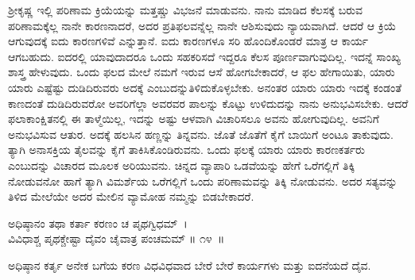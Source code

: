 ಶ‍್ರೀಕೃಷ್ಣ ಇಲ್ಲಿ ಪರಿಣಾಮ ಕ್ರಿಯೆಯನ್ನು ಮತ್ತಷ್ಚು ವಿಭಜನೆ ಮಾಡುವನು. ನಾನು ಮಾಡಿದ ಕೆಲಸಕ್ಕೆ ಬರುವ ಪರಿಣಾಮಕ್ಕೆಲ್ಲ ನಾನೇ ಕಾರಣನಾದರೆ, ಅದರ ಪ್ರತಿಫಲವನ್ನೆಲ್ಲ ನಾನೇ ಆಶಿಸುವುದು ನ್ಯಾಯವಾಗಿದೆ. ಆದರೆ ಆ ಕ್ರಿಯೆ ಆಗುವುದಕ್ಕೆ ಐದು ಕಾರಣಗಳಿವೆ ಎನ್ನುತ್ತಾನೆ. ಐದು ಕಾರಣಗಳೂ ಸರಿ ಹೊಂದಿಕೊಂಡರೆ ಮಾತ್ರ ಆ ಕಾರ್ಯ ಆಗಬಹುದು. ಐದರಲ್ಲಿ ಯಾವು\-ದಾದರೂ ಒಂದು ಸಹಕರಿಸದೆ ಇದ್ದರೂ ಕೆಲಸ ಪೂರ್ಣವಾಗುವುದಿಲ್ಲ. ಇದನ್ನೆ ಸಾಂಖ್ಯ ಶಾಸ್ತ್ರ ಹೇಳುವುದು. ಒಂದು ಫಲದ ಮೇಲೆ ನಮಗೆ ಇರುವ ಆಸೆ ಹೋಗಬೇಕಾದರೆ, ಆ ಫಲ ಹೇಗಾಯಿತು, ಯಾರು ಯಾರು ಎಷ್ಟೆಷ್ಟು ದುಡಿದಿರುವರು ಅದಕ್ಕೆ ಎಂಬುದನ್ನು\break ತಿಳಿದುಕೊಳ್ಳಬೇಕು. ಅನಂತರ ಯಾರು ಯಾರು ಇದಕ್ಕೆ ಕಂಡಂತೆ ಕಾಣದಂತೆ ದುಡಿದಿರುವರೋ ಅವರಿಗೆಲ್ಲಾ ಅವರವರ ಪಾಲನ್ನು ಕೊಟ್ಟು ಉಳಿದುದನ್ನು ನಾನು ಅನುಭವಿಸಬೇಕು. ಆದರೆ ಫಲಾಕಾಂಕ್ಷಿತನಲ್ಲಿ ಈ ತಾಳ್ಮೆಯಿಲ್ಲ, ಇದನ್ನು ಅಷ್ಟು ಆಳವಾಗಿ ವಿಚಾರಿಸಲೂ ಅವನು ಹೋಗುವುದಿಲ್ಲ. ಅವನಿಗೆ ಅನುಭವಿಸುವ ಆತುರ. ಅದಕ್ಕೆ ಹಲಸಿನ ಹಣ್ಣನ್ನು ತಿನ್ನವನು. ಜೊತೆ ಜೊತೆಗೆ ಕೈಗೆ ಬಾಯಿಗೆ ಅಂಟೂ ತಾಕುವುದು. ತ್ಯಾಗಿ ಅನಾಸಕ್ತಿಯ ತೈಲವನ್ನು ಕೈಗೆ ತಾಕಿಸಿಕೊಂಡಿರುವನು. ಒಂದು ಫಲಕ್ಕೆ ಯಾರು ಯಾರು ಕಾರಣಕರ್ತರು ಎಂಬುದನ್ನು ವಿಚಾರದ ಮೂಲಕ ಅರಿಯುವನು. ಚಿನ್ನದ ವ್ಯಾಪಾರಿ ಒಡವೆಯನ್ನು ಹೇಗೆ ಒರೆಗಲ್ಲಿಗೆ ತಿಕ್ಕಿ ನೋಡುವನೋ ಹಾಗೆ ತ್ಯಾಗಿ ವಿಮರ್ಶೆಯ ಒರೆಗಲ್ಲಿಗೆ ಒಂದು ಪರಿಣಾಮವನ್ನು ತಿಕ್ಕಿ ನೋಡುವನು. ಅದರ ಸತ್ಯವನ್ನು ತಿಳಿದ ಮೇಲೆಯೇ ಅದರ ಮೇಲಿನ ವ್ಯಾಮೋಹ ನಮ್ಮನ್ನು ಬಿಡಬೇಕಾದರೆ.

\begin{shloka}
ಅಧಿಷ್ಠಾನಂ ತಥಾ ಕರ್ತಾ ಕರಣಂ ಚ ಪೃಥಗ್ವಿಧಮ್~।\\ವಿವಿಧಾಶ್ಚ ಪೃಥಕ್ಚೇಷ್ಟಾ ದೈವಂ ಚೈವಾತ್ರ ಪಂಚಮಮ್ \hfill॥ ೧೪~॥
\end{shloka}

\begin{artha}
ಅಧಿಷ್ಠಾನ ಕರ್ತೃ ಅನೇಕ ಬಗೆಯ ಕರಣ ವಿಧವಿಧವಾದ ಬೇರೆ ಬೇರೆ ಕಾರ್ಯಗಳು ಮತ್ತು ಐದನೆಯದೆ ದೈವ.
\end{artha}

